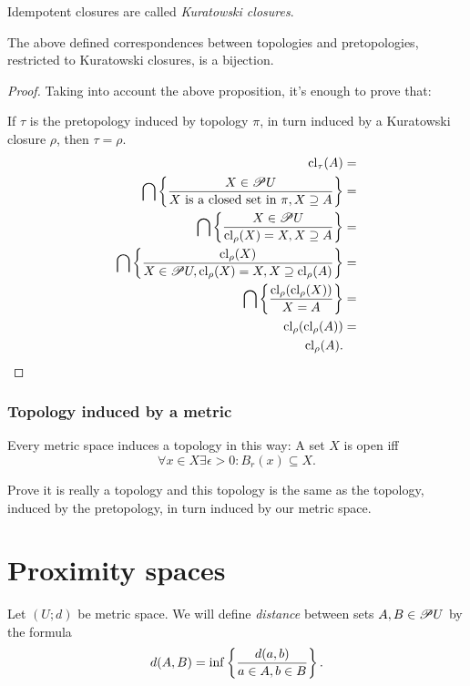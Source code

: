 \begin{defn}
Idempotent closures are called \emph{Kuratowski
closures}.\end{defn}
\begin{thm}
The above defined correspondences between topologies and pretopologies,
restricted to Kuratowski closures, is a bijection.\end{thm}
\begin{proof}
Taking into account the above proposition, it's enough to prove that:

If $\tau$ is the pretopology induced by topology $\pi$, in turn
induced by a Kuratowski closure $\rho$, then $\tau=\rho$.
\begin{align*}
\operatorname{cl}_{\tau}(A) & =\\
\bigcap\left\{ \frac{X\in\mathscr{P} U}{X\text{ is a closed set in }\pi,X\supseteq A}\right\} & =\\
\bigcap\left\{ \frac{X\in\mathscr{P} U}{\operatorname{cl}_{\rho}(X)=X,X\supseteq A}\right\} & =\\
\bigcap\left\{ \frac{\operatorname{cl}_{\rho}(X)}{X\in\mathscr{P} U,\operatorname{cl}_{\rho}(X)=X,X\supseteq\operatorname{cl}_{\rho}(A)}\right\} & =\\
\bigcap\left\{ \frac{\operatorname{cl}_{\rho}(\operatorname{cl}_{\rho}(X))}{X=A}\right\} & =\\
\operatorname{cl}_{\rho}(\operatorname{cl}_{\rho}(A)) & =\\
\operatorname{cl}_{\rho}(A).
\end{align*}

\end{proof}

\subsubsection{Topology induced by a metric}
\begin{defn}
Every metric space induces a topology in this way: A set $X$ is open
iff
\[
\forall x\in X\exists\epsilon>0:B_{r}(x)\subseteq X.
\]
\end{defn}
\begin{xca}
Prove it is really a topology and this topology is the same as the
topology, induced by the pretopology, in turn induced by our metric
space.
\end{xca}

\section{\label{sec-prox}Proximity spaces}

Let $(U;d)$ be metric space. We will define \emph{distance} between
sets $A,B\in\mathscr{P} U$ by the formula
\[
d(A,B)=\inf\left\{ \frac{d(a,b)}{a\in A,b\in B}\right\}.
\]


